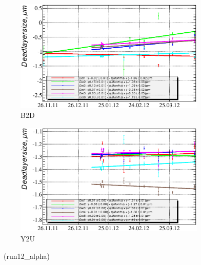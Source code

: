 \documentclass[a4paper,12pt]{article}
\begin{document}
\begin{figure}[htb]
\begin{subfigure}[t]{0.49\textwidth}
\includegraphics[width=\textwidth]{gfx/run12_alpha/B2D/c_chDeadLayerSize_by_day_B2D.eps}
\caption{B2D}
\end{subfigure}
%
\hfill
%
\begin{subfigure}[t]{0.49\textwidth}
\includegraphics[width=\textwidth]{gfx/run12_alpha/Y2U/c_chDeadLayerSize_by_day_Y2U.eps}
\caption{Y2U}
\end{subfigure}
\caption{\xdllabel\ (run12\_alpha)}
\end{figure}
\end{document}
